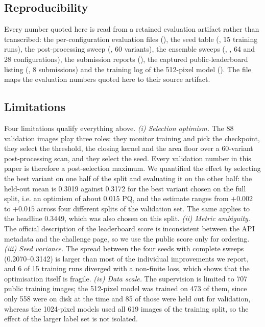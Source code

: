 \documentclass[sigconf]{acmart}
\begin{document}
\subsection{Reproducibility}
Every number quoted here is read from a retained evaluation artifact rather than
transcribed: the per-configuration evaluation files
(), the seed table (,
15 training runs), the post-processing sweep
(, 60 variants), the ensemble sweeps
(, , 64 and
28 configurations), the submission reports (),
the captured public-leaderboard listing (,
8 submissions) and the training log of the 512-pixel model
(). The file  maps the evaluation
numbers quoted here to their source artifact.

\subsection{Limitations}
\label{sec:limits}
Four limitations qualify everything above. \emph{(i) Selection optimism.} The
88 validation images play three roles: they monitor training and pick the
checkpoint, they select the threshold, the closing kernel and the area floor
over a 60-variant post-processing scan, and they select the seed. Every
validation number in this paper is therefore a post-selection maximum. We
quantified the effect by selecting the best variant on one half of the split
and evaluating it on the other half: the held-out mean is 0.3019 against
0.3172 for the best variant chosen on the full split, i.e. an optimism of
about 0.015 PQ, and the estimate ranges from $+0.002$ to $+0.015$ across four
different splits of the validation set. The same applies to the headline 0.3449, which was also
chosen on this split. \emph{(ii) Metric ambiguity.} The official description
of the leaderboard score is inconsistent between the API metadata and the
challenge page, so we use the public score only for ordering. \emph{(iii) Seed
variance.} The spread between the four seeds with complete sweeps
(0.2070--0.3142) is larger than most of
the individual improvements we report, and 6 of 15 training runs diverged with
a non-finite loss, which shows that the optimisation itself is fragile.
\emph{(iv) Data scale.} The supervision is limited to 707 public training
images; the 512-pixel model was trained on 473 of them, since only 558 were
on disk at the time and 85 of those were held out for validation, whereas the
1024-pixel models used all 619 images of the training split, so the effect of
the larger label set is not isolated.
\end{document}
